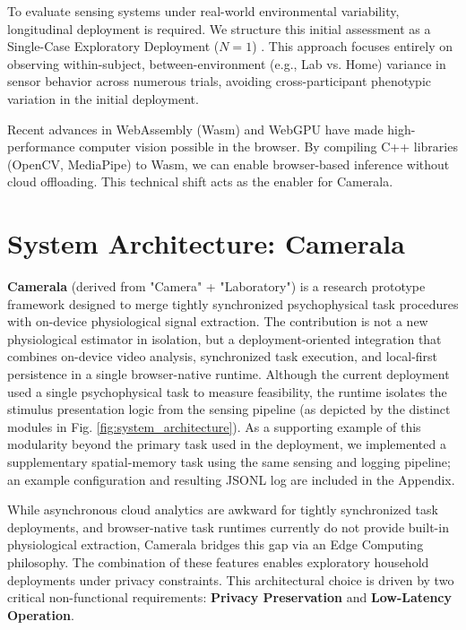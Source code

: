 \documentclass[dvipdfmx]{ehis}
\begin{document}
To evaluate sensing systems under real-world environmental variability, longitudinal deployment is required. We structure this initial assessment as a Single-Case Exploratory Deployment ($N=1$) \cite{barlow_sced}. This approach focuses entirely on observing within-subject, between-environment (e.g., Lab vs. Home) variance in sensor behavior across numerous trials, avoiding cross-participant phenotypic variation in the initial deployment.

Recent advances in WebAssembly (Wasm) and WebGPU have made high-performance computer vision possible in the browser.
By compiling C++ libraries (OpenCV, MediaPipe) to Wasm, we can enable browser-based inference without cloud offloading. This technical shift acts as the enabler for Camerala.

\section{System Architecture: Camerala}
\textbf{Camerala} (derived from "Camera" + "Laboratory") is a research prototype framework designed to merge tightly synchronized psychophysical task procedures with on-device physiological signal extraction. The contribution is not a new physiological estimator in isolation, but a deployment-oriented integration that combines on-device video analysis, synchronized task execution, and local-first persistence in a single browser-native runtime. Although the current deployment used a single psychophysical task to measure feasibility, the runtime isolates the stimulus presentation logic from the sensing pipeline (as depicted by the distinct modules in Fig. \ref{fig:system_architecture}). As a supporting example of this modularity beyond the primary task used in the deployment, we implemented a supplementary spatial-memory task using the same sensing and logging pipeline; an example configuration and resulting JSONL log are included in the Appendix.

While asynchronous cloud analytics are awkward for tightly synchronized task deployments, and browser-native task runtimes currently do not provide built-in physiological extraction, Camerala bridges this gap via an Edge Computing philosophy. The combination of these features enables exploratory household deployments under privacy constraints. This architectural choice is driven by two critical non-functional requirements: \textbf{Privacy Preservation} and \textbf{Low-Latency Operation}.
\end{document}
